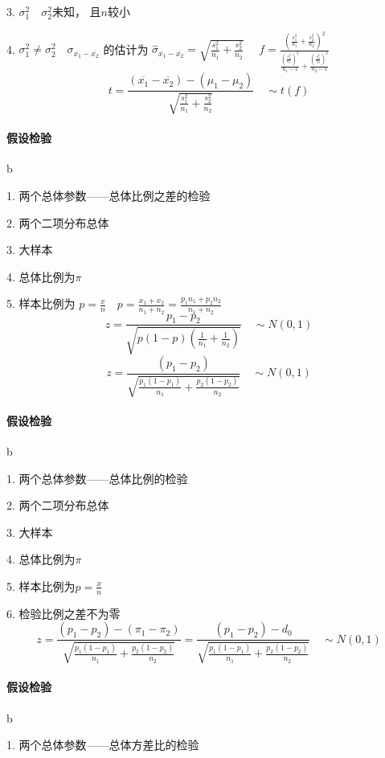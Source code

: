 \documentclass[UTF8,10pt]{book}
\begin{document}
    3. $\sigma_1^2 \quad \sigma_2^2$未知，    且$n$较小 
    
    4. $\sigma_1^2 \neq \sigma_2^2 \quad \sigma_{\overline{x_1} - \overline{x_2}} $
    的估计为 $ \hat{\sigma}_{\overline{x_1} - \overline{x_2}} =\sqrt{\frac{s_1^2}{n_1}+\frac{s_2^2}{n_2}} \quad$ 
    $f = \frac{(\frac{s_1^2}{n_1}+\frac{s_2^2}{n_2})^2}{\frac{(\frac{s_1^2}{n_1})^2}{n_1-1} + \frac{(\frac{s_2^2}{n_2})^2}{n_2-1}}$ 
    $$t = \frac{( \overline{x_1} - \overline{x_2} )- (\mu_1-\mu_2)}{\sqrt{\frac{s_1^2}{n_1}+\frac{s_2^2}{n_2}}} \quad \sim t(f)$$
    
    \paragraph{假设检验} b
    
    1. 两个总体参数——总体比例之差的检验 
    
    2. 两个二项分布总体 
    
    3. 大样本 
    
    4. 总体比例为$\pi$ 
    
    5. 样本比例为
    $p = \frac{x}{n} \quad p = \frac{x_1 +x_2}{n_1 + n_2}=\frac{p_1 n_1+p_2 n_2}{n_1 + n_2}$ 
    $$ z = \frac{p_1 - p_2}{\sqrt{p(1-p)(\frac{1}{n_1}+\frac{1}{n_2})}} \quad \sim N(0,1)$$ $$ z = \frac{(p_1-p_2)}{\sqrt{\frac{p_1(1-p_1)}{n_1} + \frac{p_2(1-p_2)}{n_2} }} \quad \sim N(0,1)$$
    
    \paragraph{假设检验} b
    
    1. 两个总体参数——总体比例的检验 
    
    2. 两个二项分布总体 
    
    3. 大样本 
    
    4. 总体比例为$\pi$ 
    
    5. 样本比例为$p = \frac{x}{n}$ 
    
    6. 检验比例之差不为零	
    $$ z = \frac{(p_1-p_2)-(\pi_1-\pi_2)}{\sqrt{\frac{p_1(1-p_1)}{n_1} + \frac{p_2(1-p_2)}{n_2} }} = \frac{(p_1-p_2)-d_0}{\sqrt{\frac{p_1(1-p_1)}{n_1} + \frac{p_2(1-p_2)}{n_2} }} \quad \sim N(0,1)$$
    
    \paragraph{假设检验} b
    
    1. 两个总体参数——总体方差比的检验 
    
\end{document}

